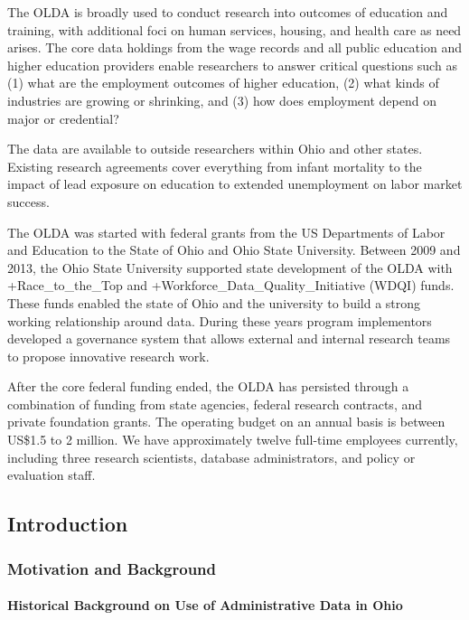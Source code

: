\documentclass[
]{WileySix}
\begin{document}
The OLDA is broadly used to conduct research into outcomes of education and training, with additional foci on human services, housing, and health care as need arises. The core data holdings from the wage records and all public education and higher education providers enable researchers to answer critical questions such as (1) what are the employment outcomes of higher education, (2) what kinds of industries are growing or shrinking, and (3) how does employment depend on major or credential?

The data are available to outside researchers within Ohio and other states. Existing research agreements cover everything from infant mortality to the impact of lead exposure on education to extended unemployment on labor market success.

The OLDA was started with federal grants from the US Departments of Labor and Education to the State of Ohio and Ohio State University. Between 2009 and 2013, the Ohio State University supported state development of the OLDA with +Race\_to\_the\_Top\textbar{} and +Workforce\_Data\_Quality\_Initiative\textbar{} (WDQI) funds. These funds enabled the state of Ohio and the university to build a strong working relationship around data. During these years program implementors developed a governance system that allows external and internal research teams to propose innovative research work.

After the core federal funding ended, the OLDA has persisted through a combination of funding from state agencies, federal research contracts, and private foundation grants. The operating budget on an annual basis is between US\$1.5 to 2 million. We have approximately twelve full-time employees currently, including three research scientists, database administrators, and policy or evaluation staff.

\hypertarget{introduction-2}{%
\subsection{Introduction}\label{introduction-2}}

\hypertarget{motivation-and-background-1}{%
\subsubsection{Motivation and Background}\label{motivation-and-background-1}}

\hypertarget{historical-background-on-use-of-administrative-data-in-ohio}{%
\paragraph{Historical Background on Use of Administrative Data in Ohio}\label{historical-background-on-use-of-administrative-data-in-ohio}}
\end{document}
